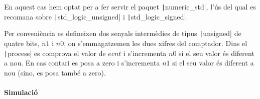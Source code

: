 En aquest cas hem optat per a fer servir el paquet \texttt|numeric_std|, l'ús del qual
es recomana sobre \texttt|std_logic_unsigned| i \texttt|std_logic_signed|.

Per conveniència es defineixen dos senyals intermèdies de tipus \texttt|unsigned|
de quatre bits, $n1$ i $n0$, on s'emmagatzemen les dues xifres del comptador.
Dins el \texttt|process| es comprova el valor de $ecnt$ i s'incrementa $n0$ si
el seu valor és diferent a nou. En cas contari es posa a zero i s'incrementa $n1$ si el
seu valor és diferent a nou (sino, es posa també a zero).

\paragraph{Simulació}

